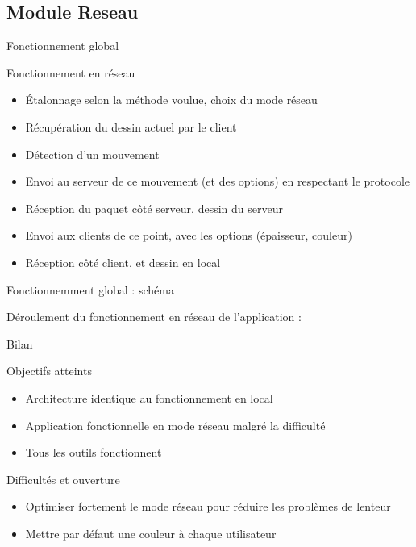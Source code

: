 \documentclass{beamer}
\begin{document}
	\subsection{Module Reseau}
		\begin{frame}{Fonctionnement global}
			\begin{block}{Fonctionnement en réseau}
				\begin{itemize}
				\item Étalonnage selon la méthode voulue, choix du mode réseau
				\item Récupération du dessin actuel par le client
				\item Détection d'un mouvement
				\item Envoi au serveur de ce mouvement (et des options) en respectant le protocole
				\item Réception du paquet côté serveur, dessin du serveur
				\item Envoi aux clients de ce point, avec les options (épaisseur, couleur)
				\item Réception côté client, et dessin en local
				\end{itemize}
			\end{block}
		\end{frame}
		
		\begin{frame}{Fonctionnemment global : schéma}
		
		Déroulement du fonctionnement en réseau de l'application :
			\begin{center}
			\scalebox{0.5}{} 
			\end{center}
		\end{frame}
		
		\begin{frame}{Bilan}
			\begin{exampleblock}{Objectifs atteints}
				\begin{itemize}
				\item Architecture identique au fonctionnement en local
				\item Application fonctionnelle en mode réseau malgré la difficulté
				\item Tous les outils fonctionnent
				\end{itemize}
			\end{exampleblock}
			\pause
			\begin{alertblock}{Difficultés et ouverture}
				\begin{itemize}
				\item Optimiser fortement le mode réseau pour réduire les problèmes de lenteur
				\item Mettre par défaut une couleur à chaque utilisateur
				\end{itemize}
			\end{alertblock}
		\end{frame}
\end{document}
